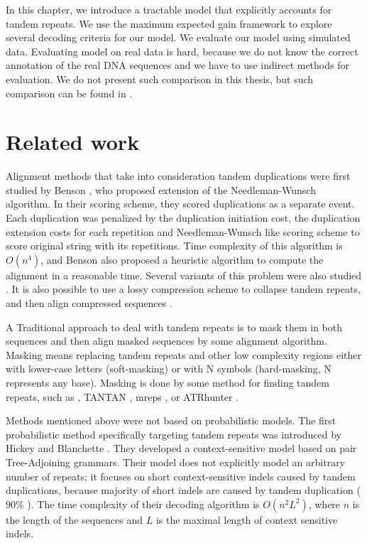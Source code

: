 In this chapter, we introduce a tractable model that explicitly accounts for
tandem repeats. We use the maximum expected gain framework to explore several
decoding criteria for our model. We evaluate our model using simulated data.
Evaluating model on real data is hard, because we do not know the correct
annotation of the real DNA sequences and we have to use indirect methods for
evaluation. We do not present such comparison in this thesis, but such
comparison can be found in \cite{Nanasi2014}.

\section{Related work}\label{SECTION:REPALNMETHODS}

 Alignment methods that take into consideration tandem
duplications were first studied by Benson \cite{Benson1997}, who proposed
extension of the Needleman-Wunsch algorithm. In their scoring scheme, they
scored duplications as a separate event. Each duplication was penalized by the
duplication initiation cost, the duplication extension costs for each
repetition and Needleman-Wunsch like scoring scheme to score original string
with its repetitions. Time complexity of this algorithm is $O(n^4)$, and Benson
also proposed a heuristic algorithm to compute the alignment in a reasonable
time.  Several variants of this problem were also studied \cite{Sammeth2006,
Berard2006}. It is also possible to use a
lossy compression scheme to collapse tandem repeats, and then align compressed
sequences \cite{Freschi2012}.

A Traditional approach to deal with tandem repeats is to mask them in both
sequences and then align masked sequences by some alignment algorithm.  Masking
means replacing tandem repeats and other low complexity regions either with
lower-case letters (soft-masking) or with N symbols (hard-masking, N represents
any base). Masking is done by some method for finding tandem repeats, such as
 \cite{Benson1999}, TANTAN
\cite{Frith2011}, mreps \cite{Kolpakov2003}, or ATRhunter \cite{Wexler2005}. 

Methods mentioned above were not based on probabilistic models. The first
probabilistic method specifically targeting tandem repeats was introduced by
Hickey and Blanchette \cite{Hickey2011}.  They developed a context-sensitive
model based on pair Tree-Adjoining grammars.  Their model does not explicitly
model an arbitrary number of repeats; it focuses on short context-sensitive
indels caused by tandem duplications, because majority of short indels are
caused by tandem duplication ($90\%$ \cite{Hickey2011}). The time complexity of
their decoding algorithm is $O(n^2L^2)$, where $n$ is the length of the
sequences and $L$ is the maximal length of context sensitive indels.

